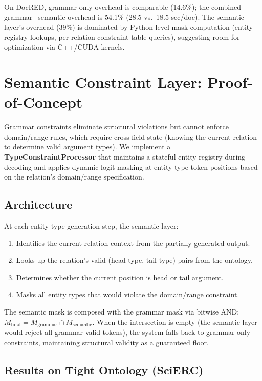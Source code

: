 \documentclass[11pt,a4paper]{article}
\begin{document}
On DocRED, grammar-only overhead is comparable (14.6\%); the combined grammar+semantic overhead is 54.1\% (28.5 vs.\ 18.5 sec/doc).
The semantic layer's overhead (39\%) is dominated by Python-level mask computation (entity registry lookups, per-relation constraint table queries), suggesting room for optimization via C++/CUDA kernels.

\section{Semantic Constraint Layer: Proof-of-Concept}
\label{sec:semantic}

Grammar constraints eliminate structural violations but cannot enforce domain/range rules, which require cross-field state (knowing the current relation to determine valid argument types).
We implement a \textbf{TypeConstraintProcessor} that maintains a stateful entity registry during decoding and applies dynamic logit masking at entity-type token positions based on the relation's domain/range specification.

\subsection{Architecture}

At each entity-type generation step, the semantic layer:
\begin{enumerate}
\item Identifies the current relation context from the partially generated output.
\item Looks up the relation's valid (head-type, tail-type) pairs from the ontology.
\item Determines whether the current position is head or tail argument.
\item Masks all entity types that would violate the domain/range constraint.
\end{enumerate}

The semantic mask is composed with the grammar mask via bitwise AND: $M_{\text{final}} = M_{\text{grammar}} \cap M_{\text{semantic}}$.
When the intersection is empty (the semantic layer would reject all grammar-valid tokens), the system falls back to grammar-only constraints, maintaining structural validity as a guaranteed floor.

\subsection{Results on Tight Ontology (SciERC)}
\label{sec:scierc_results}
\end{document}
